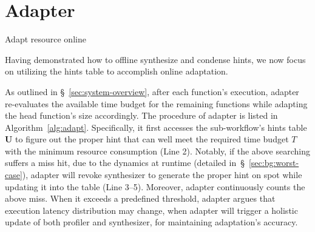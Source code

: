 \section{Adapter}
\label{sec:adapter}
\begin{algorithm}[!t]
    
	\caption{Adapt resource online }
 	\LinesNumbered    
    
\label{alg:adapt}
\end{algorithm}

Having demonstrated how to offline synthesize and condense hints, we now focus on utilizing the hints table to accomplish online adaptation.

As outlined in \S~\ref{sec:system-overview},  after each function's execution, adapter re-evaluates the available time budget for the remaining functions while adapting the head function's size accordingly.
The procedure of adapter is listed in Algorithm~\ref{alg:adapt}.
Specifically, it first accesses the sub-workflow's hints table $\mathbf{U}$ to figure out the proper hint that can well meet the required time budget $T$ with the minimum resource consumption (Line 2).
Notably, if the above searching suffers a miss hit, due to the dynamics at runtime (detailed in~\S~\ref{sec:bg:worst-case}), adapter will revoke synthesizer to generate the proper hint on spot while updating it into the table (Line 3--5).
Moreover, adapter continuously counts the above miss. 
When it exceeds a predefined threshold, adapter argues that execution latency distribution may change, when adapter will trigger a holistic update of both profiler and synthesizer, for maintaining adaptation's accuracy.

